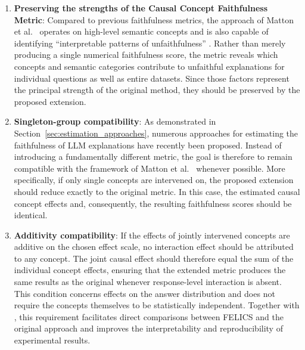 \begin{enumerate}[
		label=\textbf{R\arabic*},
		ref=R\arabic*,
		wide=0pt,
		leftmargin=0pt
	]
	\item \label{req:preserving_strengths} \textbf{Preserving the strengths of the Causal Concept Faithfulness Metric}:
	      Compared to previous faithfulness metrics, the approach of Matton et al.~\cite{mattonWalkTalkMeasuring2024} operates on high-level semantic concepts and is also capable of identifying \enquote{interpretable patterns of unfaithfulness} \cite{mattonWalkTalkMeasuring2024}. Rather than merely producing a single numerical faithfulness score, the metric reveals which concepts and semantic categories contribute to unfaithful explanations for individual questions as well as entire datasets. Since those factors represent the principal strength of the original method, they should be preserved by the proposed extension.

	\item \label{req:one_item_group} \textbf{Singleton-group compatibility}:
	      As demonstrated in Section~\ref{sec:estimation_approaches}, numerous approaches for estimating the faithfulness of LLM explanations have recently been proposed. Instead of introducing a fundamentally different metric, the goal is therefore to remain compatible with the framework of Matton et al.~\cite{mattonWalkTalkMeasuring2024} whenever possible. More specifically, if only single concepts are intervened on, the proposed extension should reduce exactly to the original metric. In this case, the estimated causal concept effects and, consequently, the resulting faithfulness scores should be identical.

	\item \label{req:independence_behavior} \textbf{Additivity compatibility}:
	      If the effects of jointly intervened concepts are additive on the chosen effect scale, no interaction effect should be attributed to any concept. The joint causal effect should therefore equal the sum of the individual concept effects, ensuring that the extended metric produces the same results as the original whenever response-level interaction is absent. This condition concerns effects on the answer distribution and does not require the concepts themselves to be statistically independent. Together with , this requirement facilitates direct comparisons between FELICS and the original approach and improves the interpretability and reproducibility of experimental results.


\end{enumerate}
